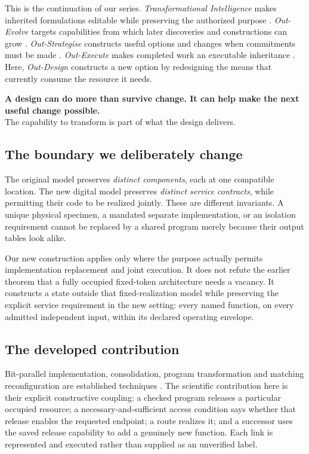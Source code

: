 \documentclass[11pt,letterpaper]{article}
\theoremstyle{definition}\newtheorem{definition}[theorem]{Definition}
\theoremstyle{remark}\newtheorem{remark}[theorem]{Remark}
\begin{document}
This is the continuation of our series. \emph{Transformational Intelligence} makes inherited formulations editable while preserving the authorized purpose \citep{ti}. \emph{Out-Evolve} targets capabilities from which later discoveries and constructions can grow \citep{evolve}. \emph{Out-Strategise} constructs useful options and changes when commitments must be made \citep{strategise}. \emph{Out-Execute} makes completed work an executable inheritance \citep{execute}. Here, \emph{Out-Design} constructs a new option by redesigning the means that currently consume the resource it needs.

\begin{thesis}
\textbf{A design can do more than survive change. It can help make the next useful change possible.}\\[.25em]
The capability to transform is part of what the design delivers.
\end{thesis}

\subsection{The boundary we deliberately change}
The original model preserves \emph{distinct components}, each at one compatible location. The new digital model preserves \emph{distinct service contracts}, while permitting their code to be realized jointly. These are different invariants. A unique physical specimen, a mandated separate implementation, or an isolation requirement cannot be replaced by a shared program merely because their output tables look alike.

Our new construction applies only where the purpose actually permits implementation replacement and joint execution. It does not refute the earlier theorem that a fully occupied fixed-token architecture needs a vacancy. It constructs a state outside that fixed-realization model while preserving the explicit service requirement in the new setting: every named function, on every admitted independent input, within its declared operating envelope.

\subsection{The developed contribution}
Bit-parallel implementation, consolidation, program transformation and matching reconfiguration are established techniques \citep{biham,usuba,ferdaus,aichholzer}. The scientific contribution here is their explicit constructive coupling: a checked program releases a particular occupied resource; a necessary-and-sufficient access condition says whether that release enables the requested endpoint; a route realizes it; and a successor uses the saved release capability to add a genuinely new function. Each link is represented and executed rather than supplied as an unverified label.
\end{document}
